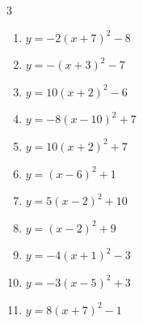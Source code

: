\begin{multicols}{3}
\begin{enumerate}
  \item $\displaystyle y=-2\left( x+7\right)^{2}-8$

        \phantom{$\displaystyle 頂点\left( -7 , -8 \right)$}

  \item $\displaystyle y=-\left( x+3\right)^{2}-7$

        \phantom{$\displaystyle 頂点\left( -3 , -7 \right)$}

  \item $\displaystyle y=10\left( x+2\right)^{2}-6$

        \phantom{$\displaystyle 頂点\left( -2 , -6 \right)$}

  \item $\displaystyle y=-8\left( x-10\right)^{2}+7$

        \phantom{$\displaystyle 頂点\left( 10 , 7 \right)$}

  \item $\displaystyle y=10\left( x+2\right)^{2}+7$

        \phantom{$\displaystyle 頂点\left( -2 , 7 \right)$}

  \item $\displaystyle y=\left( x-6\right)^{2}+1$

        \phantom{$\displaystyle 頂点\left( 6 , 1 \right)$}

  \item $\displaystyle y=5\left( x-2\right)^{2}+10$

        \phantom{$\displaystyle 頂点\left( 2 , 10 \right)$}

  \item $\displaystyle y=\left( x-2\right)^{2}+9$

        \phantom{$\displaystyle 頂点\left( 2 , 9 \right)$}

\columnbreak %

  \item $\displaystyle y=-4\left( x+1\right)^{2}-3$

        \phantom{$\displaystyle 頂点\left( -1 , -3 \right)$}

  \item $\displaystyle y=-3\left( x-5\right)^{2}+3$

        \phantom{$\displaystyle 頂点\left( 5 , 3 \right)$}

  \item $\displaystyle y=8\left( x+7\right)^{2}-1$

        \phantom{$\displaystyle 頂点\left( -7 , -1 \right)$}


\end{enumerate}
\end{multicols}
